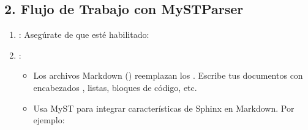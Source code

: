 \documentclass[a4paper,10pt,oneside,spanish,openany]{sphinxmanual}
\begin{document}
\subsection{2. Flujo de Trabajo con MyST\sphinxhyphen{}Parser}
\label{\detokenize{configuracion_inicial/004.estructura_inicial_proyecto:flujo-de-trabajo-con-myst-parser}}\begin{enumerate}
%
\item {} 
\sphinxAtStartPar
{}: Asegúrate de que  esté habilitado:

\begin{sphinxVerbatim}[commandchars=\\\{\}]
  \PYG{p}{[}\PYG{p}{]}
  
     
\end{sphinxVerbatim}

\item {} 
\sphinxAtStartPar
{}:
\begin{itemize}
\item {} 
\sphinxAtStartPar
Los archivos Markdown () reemplazan los . Escribe tus documentos con encabezados \sphinxcode{\sphinxupquote{\#}}, listas, bloques de código, etc.

\item {} 
\sphinxAtStartPar
Usa MyST para integrar características de Sphinx en Markdown. Por ejemplo:

\begin{sphinxVerbatim}[commandchars=\\\{\}]

 

\end{sphinxVerbatim}

\end{itemize}


\end{enumerate}
\end{document}
